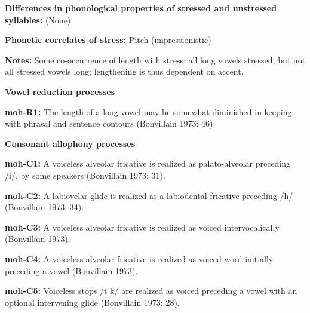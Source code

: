 \begin{styleBody}
\textbf{Differences in phonological properties of stressed and unstressed syllables:} (None)
\end{styleBody}

\begin{styleBody}
\textbf{Phonetic correlates of stress: }Pitch (impressionistic)
\end{styleBody}

\begin{styleBody}
\textbf{Notes: }Some co-occurrence of length with stress: all long vowels stressed, but not all stressed vowels long; lengthening is thus dependent on accent.
\end{styleBody}

\begin{styleBody}
\textbf{Vowel reduction processes}
\end{styleBody}

\begin{styleBody}
\textbf{moh-R1:} The length of a long vowel may be somewhat diminished in keeping with phrasal and sentence contours (Bonvillain 1973: 46).
\end{styleBody}

\begin{styleBody}
\textbf{Consonant allophony processes}
\end{styleBody}

\begin{styleBody}
\textbf{moh-C1: }A voiceless alveolar fricative is realized as palato-alveolar preceding /i/, by some speakers (Bonvillain 1973: 31).
\end{styleBody}

\begin{styleBody}
\textbf{moh-C2: }A labiovelar glide is realized as a labiodental fricative preceding /h/ (Bonvillain 1973: 34).
\end{styleBody}

\begin{styleBody}
\textbf{moh-C3: }A voiceless alveolar fricative is realized as voiced intervocalically (Bonvillain 1973).
\end{styleBody}

\begin{styleBody}
\textbf{moh-C4: }A voiceless alveolar fricative is realized as voiced word-initially preceding a vowel (Bonvillain 1973).
\end{styleBody}

\begin{styleBody}
\textbf{moh-C5: }Voiceless stops /t k/ are realized as voiced preceding a vowel with an optional intervening glide (Bonvillain 1973: 28).
\end{styleBody}

